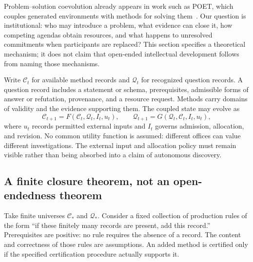 Problem--solution coevolution already appears in work such as POET, which couples generated environments with methods for solving them~\cite{MS:poet}. Our question is institutional: who may introduce a problem, what evidence can close it, how competing agendas obtain resources, and what happens to unresolved commitments when participants are replaced? This section specifies a theoretical mechanism; it does not claim that open-ended intellectual development follows from naming those mechanisms.

Write $\mathcal C_t$ for available method records and $\mathcal Q_t$ for recognized question records. A question record includes a statement or schema, prerequisites, admissible forms of answer or refutation, provenance, and a resource request. Methods carry domains of validity and the evidence supporting them. The coupled state may evolve as
\[
\mathcal C_{t+1}=F(\mathcal C_t,\mathcal Q_t,I_t,u_t),\qquad
\mathcal Q_{t+1}=G(\mathcal Q_t,\mathcal C_t,I_t,u_t),
\]
where $u_t$ records permitted external inputs and $I_t$ governs admission, allocation, and revision. No common utility function is assumed: different offices can value different investigations. The external input and allocation policy must remain visible rather than being absorbed into a claim of autonomous discovery.

\subsection{A finite closure theorem, not an open-endedness theorem}
Take finite universes $\mathcal C_*$ and $\mathcal Q_*$. Consider a fixed collection of production rules of the form ``if these finitely many records are present, add this record.'' Prerequisites are positive: no rule requires the absence of a record. The content and correctness of those rules are assumptions. An added method is certified only if the specified certification procedure actually supports it.

